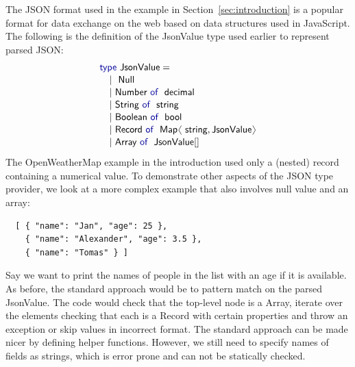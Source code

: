 \documentclass[preprint]{sigplanconf}
\newcommand{\langl}{\begin{picture}(4.5,7)
\put(1.1,2.5){\rotatebox{60}{\line(1,0){5.5}}}
\put(1.1,2.5){\rotatebox{300}{\line(1,0){5.5}}}
\end{picture}}
\newcommand{\rangl}{\begin{picture}(4.5,7)
\put(.9,2.5){\rotatebox{120}{\line(1,0){5.5}}}
\put(.9,2.5){\rotatebox{240}{\line(1,0){5.5}}}
\end{picture}}
\newcommand{\kvd}[1]{\textnormal{\textcolor{kvdclr}{\sffamily #1}}}
\newcommand{\ident}[1]{\textnormal{\sffamily #1}}
\begin{document}
The JSON format used in the example in Section~\ref{sec:introduction} is a popular format for data
exchange on the web based on data structures used in JavaScript. The following is the definition 
of the \ident{JsonValue} type used earlier to represent parsed JSON:
%
\begin{equation*}
\begin{array}{l}
 \kvd{type}~\ident{JsonValue} = \\[0.1em]
 \quad|~\ident{Null} \\[0.1em]
 \quad|~\ident{Number}~\kvd{of}~\ident{decimal} \\[0.1em]
 \quad|~\ident{String}~\kvd{of}~\ident{string} \\[0.1em]
 \quad|~\ident{Boolean}~\kvd{of}~\ident{bool} \\[0.1em]
 \quad|~\ident{Record}~\kvd{of}~\ident{Map}\langl\ident{string}, \ident{JsonValue}\rangl \\[0.1em]
 \quad|~\ident{Array}~\kvd{of}~\ident{JsonValue}[] \\[0.1em]
\end{array}
\end{equation*}
%
The OpenWeatherMap example in the introduction used only a (nested) record containing a numerical
value. To demonstrate other aspects of the JSON type provider, we look at a more complex example
that also involves \kvd{null} value and an array:
%
{\small{
\begin{verbatim}
  [ { "name": "Jan", "age": 25 },
    { "name": "Alexander", "age": 3.5 },
    { "name": "Tomas" } ]
\end{verbatim}
}}
%
\noindent
Say we want to print the names of people in the list with an age if it is available. As before, 
the standard approach would be to pattern match on the parsed \ident{JsonValue}. The code would 
check that the top-level node is a \ident{Array}, iterate over the elements checking that each is
a \ident{Record} with certain properties and throw an exception or skip values in incorrect format.
The standard approach can be made nicer by defining helper functions. However, we still need to
specify names of fields as strings, which is error prone and can not be statically checked.
\end{document}
